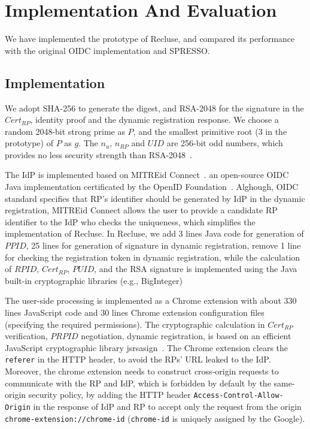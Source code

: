 \section{Implementation And Evaluation}
\label{sec:implementation}
We have implemented the prototype of Recluse, and compared its performance with the original OIDC implementation and SPRESSO.

\subsection{Implementation}
We adopt SHA-256 to generate the digest, and  RSA-2048 for the signature in  the $Cert_{RP}$, identity proof and the dynamic registration response. We  choose a random 2048-bit strong prime as $P$, and the smallest primitive root (3 in the prototype)  of $P$ as $g$. The  $n_u$, $n_{RP}$ and $UID$  are 256-bit odd numbers, which provides no less security strength than RSA-2048~\cite{barkerecommendation}.

The IdP is implemented based on MITREid Connect~\cite{MITREid}. an open-source OIDC Java implementation certificated by the OpenID Foundation~\cite{OIDF}. Alghough, OIDC standard specifies that RP's identifier should be generated by IdP in the dynamic registration, MITREid Connect allows the user to provide a candidate RP identifier to the IdP who checks the uniqueness, which simplifies the implementation of Recluse. In Recluse, we add 3 lines Java code for generation of $PPID$, 25 lines for generation of signature in dynamic registration, remove 1 line for checking the registration token in dynamic registration, while the calculation of $RPID$, $Cert_{RP}$,  $PUID$, and the RSA signature is implemented using the Java built-in cryptographic libraries (e.g., BigInteger)

The user-side processing is implemented as a Chrome extension with about 330 lines JavaScript code and 30 lines  Chrome extension configuration files (specifying the required permissions). The cryptographic calculation in $Cert_{RP}$ verification, $PRPID$ negotiation, dynamic registration, is based on an efficient JavaScript cryptographic library  jsrsasign~\cite{jsrsasign}. The Chrome extension clears the \verb+referer+ in the HTTP header, to avoid the RPs' URL leaked to the IdP. Moreover, the chrome extension needs to construct cross-origin requests to communicate with the RP and IdP, which is forbidden by default by the same-origin security policy, by adding the HTTP header \verb+Access-Control-Allow-Origin+ in the response of IdP and RP to accept only the request from the origin \verb+chrome-extension://chrome-id+ (\verb+chrome-id+ is uniquely assigned by the Google).


